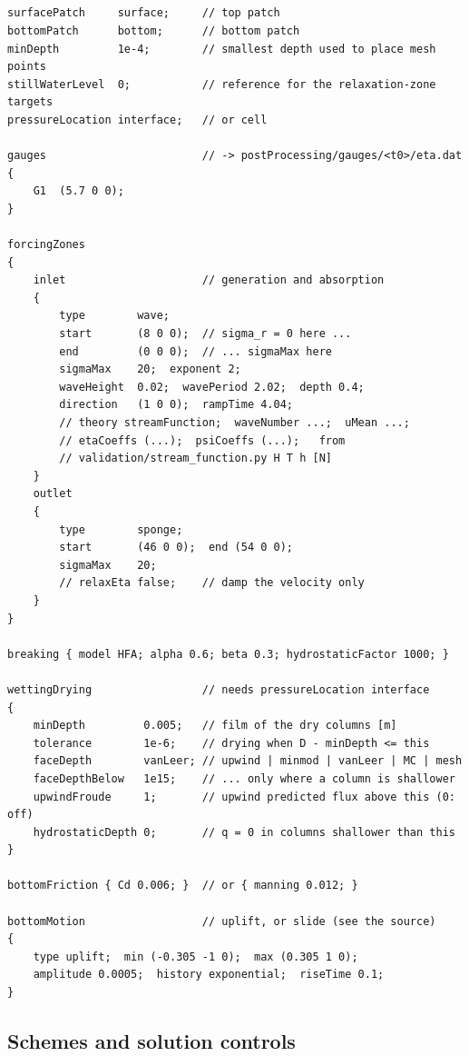 \subsection{}

\begin{verbatim}
surfacePatch     surface;     // top patch
bottomPatch      bottom;      // bottom patch
minDepth         1e-4;        // smallest depth used to place mesh points
stillWaterLevel  0;           // reference for the relaxation-zone targets
pressureLocation interface;   // or cell

gauges                        // -> postProcessing/gauges/<t0>/eta.dat
{
    G1  (5.7 0 0);
}

forcingZones
{
    inlet                     // generation and absorption
    {
        type        wave;
        start       (8 0 0);  // sigma_r = 0 here ...
        end         (0 0 0);  // ... sigmaMax here
        sigmaMax    20;  exponent 2;
        waveHeight  0.02;  wavePeriod 2.02;  depth 0.4;
        direction   (1 0 0);  rampTime 4.04;
        // theory streamFunction;  waveNumber ...;  uMean ...;
        // etaCoeffs (...);  psiCoeffs (...);   from
        // validation/stream_function.py H T h [N]
    }
    outlet
    {
        type        sponge;
        start       (46 0 0);  end (54 0 0);
        sigmaMax    20;
        // relaxEta false;    // damp the velocity only
    }
}

breaking { model HFA; alpha 0.6; beta 0.3; hydrostaticFactor 1000; }

wettingDrying                 // needs pressureLocation interface
{
    minDepth         0.005;   // film of the dry columns [m]
    tolerance        1e-6;    // drying when D - minDepth <= this
    faceDepth        vanLeer; // upwind | minmod | vanLeer | MC | mesh
    faceDepthBelow   1e15;    // ... only where a column is shallower
    upwindFroude     1;       // upwind predicted flux above this (0: off)
    hydrostaticDepth 0;       // q = 0 in columns shallower than this
}

bottomFriction { Cd 0.006; }  // or { manning 0.012; }

bottomMotion                  // uplift, or slide (see the source)
{
    type uplift;  min (-0.305 -1 0);  max (0.305 1 0);
    amplitude 0.0005;  history exponential;  riseTime 0.1;
}
\end{verbatim}

\subsection{Schemes and solution controls}

